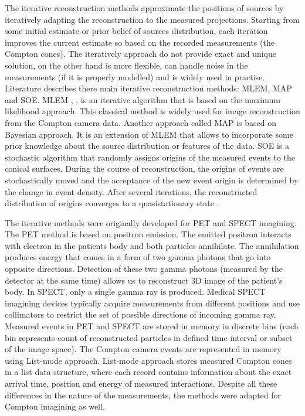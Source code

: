 The iterative reconstruction methods approximate the positions of sources by iteratively adapting the reconstruction to the measured projections.
Starting from some initial estimate or prior belief of sources distribution, each iteration improves the current estimate so based on the recorded measurements (the Compton cones).
The iteratively approach do not provide exact and unique solution, on the other hand is more flexible, can handle noise in the measurements (if it is properly modelled) and is widely used in practise.
Literature describes there main iterative reconstruction methods: \acf{MLEM}, \acf{MAP} and \acf{SOE}.
\ac{MLEM} \cite{MLEM_Shepp_1982}, \cite{MLEM_Lange_Carlson_1984}, \cite{MLEM_Wilderman_2000} is an iterative algorithm that is based on the maximum likelihood approach.
This classical method is widely used for image reconstruction from the Compton camera data. %
Another approach called \ac{MAP} \cite{MLEM_Lange_Carlson_1984} is based on Bayesian approach.
It is an extension of \ac{MLEM} that allows to incorporate some prior knowledge about the source distribution or features of the data.
\ac{SOE} is a stochastic algorithm that randomly assigns origins of the measured events to the conical surfaces.
During the course of reconstruction, the origins of events are stochastically moved and the acceptance of the new event origin is determined by the change in event density.
After several iterations, the reconstructed distribution of origins converges to a quasistationary state \cite{SOE_Andreyev_2009}.

The iterative methods were originally developed for \ac{PET} and \ac{SPECT} imagining.
The \ac{PET}  method is based on positron emission. 
The emitted positron interacts with electron in the patients body and both particles annihilate. 
The annihilation produces energy that comes in a form of two gamma photons that go into opposite directions.
Detection of these two gamma photons (measured by the detector at the same time) allows us to reconstruct 3D image of the patient's body.
In \ac{SPECT}, only a single gamma ray is produced. 
Medical \ac{SPECT} imagining devices typically acquire measurements from different positions and use collimators to restrict the set of possible directions of incoming gamma ray.
Measured events in \ac{PET} and \ac{SPECT} are stored in memory in discrete bins (each bin represents count of reconstructed particles in defined time interval or subset of the image space).
The Compton camera events are represented in memory using List-mode approach.
List-mode approach stores measured Compton cones in a list data structure, where each record contains information about the exact arrival time, position and energy of measured interactions.
Despite all these differences in the nature of the measurements, the methods were adapted for Compton imagining as well.

